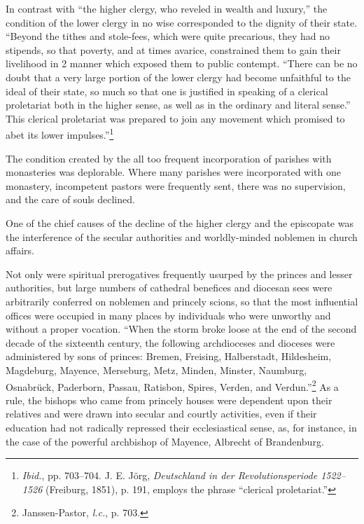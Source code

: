 In contrast with “the higher clergy, who reveled in wealth and
luxury,” the condition of the lower clergy in no wise corresponded to
the dignity of their state. “Beyond the tithes and stole-fees, which
were quite precarious, they had no stipends, so that poverty, and at
times avarice, constrained them to gain their livelihood in 2 manner
which exposed them to public contempt. “There can be no doubt that
a very large portion of the lower clergy had become unfaithful to
the ideal of their state, so much so that one is justified in speaking of
a clerical proletariat both in the higher sense, as well as in the ordinary
and literal sense.” This clerical proletariat was prepared to join
any movement which promised to abet its lower impulses.”\footnote
{\textit{Ibid.}, pp. 703--704. J. E. Jörg, \textit{Deutschland in der Revolutionsperiode 1522--1526} (Freiburg,
1851), p. 191, employs the phrase “clerical proletariat.”}

The condition created by the all too frequent incorporation of
parishes with monasteries was deplorable. Where many parishes were
incorporated with one monastery, incompetent pastors were frequently
sent, there was no supervision, and the care of souls declined.


One of the chief causes of the decline of the higher clergy and the
episcopate was the interference of the secular authorities and worldly-minded
noblemen in church affairs.

Not only were spiritual prerogatives frequently usurped by the
princes and lesser authorities, but large numbers of cathedral benefices
and diocesan sees were arbitrarily conferred on noblemen and princely
scions, so that the most influential offices were occupied in many
places by individuals who were unworthy and without a proper vocation.
“When the storm broke loose at the end of the second decade of
the sixteenth century, the following archdioceses and dioceses were
administered by sons of princes: Bremen, Freising, Halberstadt, Hildesheim,
Magdeburg, Mayence, Merseburg, Metz, Minden, Minster,
Naumburg, Osnabrück, Paderborn, Passau, Ratisbon, Spires, Verden,
and Verdun.”\footnote{Janssen-Pastor, \textit{l.c.}, p. 703.}
As a rule, the bishops who came from princely houses
were dependent upon their relatives and were drawn into secular and
courtly activities, even if their education had not radically repressed
their ecclesiastical sense, as, for instance, in the case of the powerful
archbishop of Mayence, Albrecht of Brandenburg.


